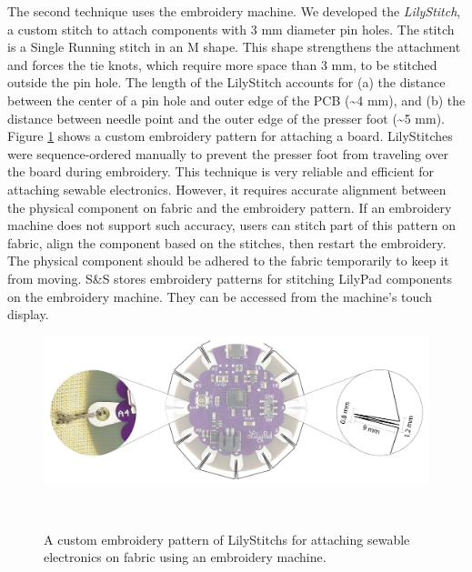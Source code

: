 \documentclass[header.tex]{subfiles}
\begin{document}
The second technique uses the embroidery machine. We developed the \textit{LilyStitch}, a custom stitch to attach components with 3 mm diameter pin holes. The stitch is a Single Running stitch in an M shape. This shape strengthens the attachment and forces the tie knots, which require more space than 3 mm, to be stitched outside the pin hole.  
The length of the LilyStitch accounts for (a) the distance between the center of a pin hole and outer edge of the PCB (\textasciitilde 4 mm), and (b) the distance between needle point and the outer edge of the presser foot (\textasciitilde 5 mm). %
Figure \ref{fig:LilyStitch} shows a custom embroidery pattern for attaching a board. LilyStitches were sequence-ordered manually to prevent the presser foot from traveling over the board during embroidery. This technique is very reliable and efficient for attaching sewable electronics. However, it requires accurate alignment between the physical component on fabric and the embroidery pattern. If an embroidery machine does not support such accuracy, users can stitch part of this pattern on fabric, align the component based on the stitches, then restart the embroidery. The physical component should be adhered to the fabric temporarily to keep it from moving. S\&S stores embroidery patterns for stitching LilyPad components on the embroidery machine. They can be accessed from the machine's touch display.

\begin{figure}[t]
\centering
  \includegraphics[width=1.0\columnwidth]{figures/LilyStitch}
  \caption{A custom embroidery pattern of LilyStitchs for attaching sewable electronics on fabric using an embroidery machine.}~\label{fig:LilyStitch}
  \vspace{-2.2em}
\end{figure}
\end{document}
